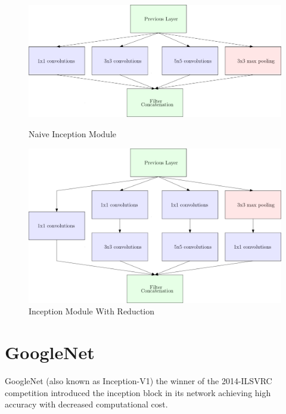 \documentclass[
a4paper, 
12pt,
grayscalebody, %
abstract=on,
twoside, BCOR10mm, 12pt, DIV13,headinclude, footexclude, final, abstracton, openright
]{ibireprt}
\numberwithin{equation}{chapter}
\numberwithin{table}{chapter}
\numberwithin{figure}{chapter}
\numberwithin{algorithm}{chapter}
\numberwithin{example}{chapter}
\numberwithin{example}{chapter}
\begin{document}
\begin{figure}[h]	
	\centering
	\begin{minipage}[t]{.49\linewidth}
		\centering
		\includegraphics[width = \textwidth]{Inception_modle_naive.png}%
		\caption{Naive Inception Module}
		\label{fig:fig_max_pooling}
		
	\end{minipage}
	\hfill
	\begin{minipage}[t]{.49\linewidth}
		\centering
		\includegraphics[width = \textwidth]{Inception_modle_reduction.png}%
		\caption{Inception Module With Reduction}
		\label{fig:fig_max_pooling}
		
	\end{minipage}
\end{figure}%

\section{GoogleNet}
GoogleNet (also known as Inception-V1) the winner of the 2014-ILSVRC competition introduced the inception block in its network achieving high accuracy with decreased computational cost. \cite{Szegedy2015}
\end{document}
